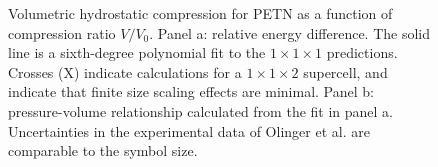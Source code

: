 \documentclass[prb,aps,nobibnotes,twocolumn,doublespace,twocolumngrid,superbib]{revtex4}
\begin{document}
\begin{figure}
\caption{Volumetric hydrostatic compression for PETN as a function of
compression ratio $V/V_0$.  Panel a: relative energy difference. The
solid line is a sixth-degree polynomial fit to the $1\times 1\times 1$ 
predictions.
Crosses (X) indicate calculations for a $1\times 1\times 2$ supercell, and indicate
that finite size scaling effects are minimal.  Panel b: pressure-volume 
relationship calculated from the fit in panel a.  Uncertainties in the 
experimental data of Olinger et al. are comparable to the symbol size.
}
\label{fig:volume_compress}
\end{figure}
\end{document}
